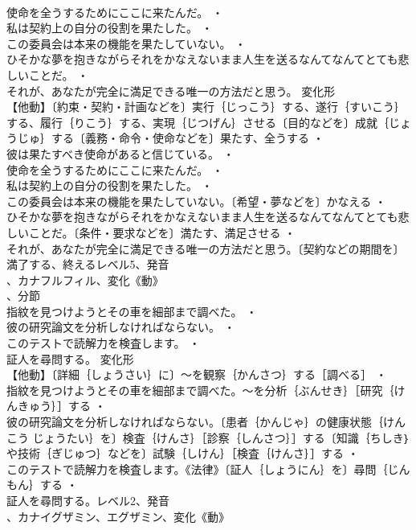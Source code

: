 \documentclass[8pt]{extreport}
\begin{document}
\begin{CJK}{UTF8}{min}
\\	使命を全うするためにここに来たんだ。 ・
\\	私は契約上の自分の役割を果たした。 ・
\\	この委員会は本来の機能を果たしていない。 ・
\\	ひそかな夢を抱きながらそれをかなえないまま人生を送るなんてなんてとても悲しいことだ。 ・
\\	それが、あなたが完全に満足できる唯一の方法だと思う。	変化形 
\\	【他動】〔約束・契約・計画などを〕実行｛じっこう｝する、遂行｛すいこう｝する、履行｛りこう｝する、実現｛じつげん｝させる〔目的などを〕成就｛じょうじゅ｝する〔義務・命令・使命などを〕果たす、全うする ・
\\	彼は果たすべき使命があると信じている。 ・
\\	使命を全うするためにここに来たんだ。 ・
\\	私は契約上の自分の役割を果たした。 ・
\\	この委員会は本来の機能を果たしていない。〔希望・夢などを〕かなえる ・
\\	ひそかな夢を抱きながらそれをかなえないまま人生を送るなんてなんてとても悲しいことだ。〔条件・要求などを〕満たす、満足させる ・
\\	それが、あなたが完全に満足できる唯一の方法だと思う。〔契約などの期間を〕満了する、終えるレベル5、発音
\\	、カナフルフィル、変化《動》
\\	、分節
\\	指紋を見つけようとその車を細部まで調べた。 ・
\\	彼の研究論文を分析しなければならない。 ・
\\	このテストで読解力を検査します。 ・
\\	証人を尋問する。	変化形 
\\	【他動】〔詳細｛しょうさい｝に〕～を観察｛かんさつ｝する［調べる］ ・
\\	指紋を見つけようとその車を細部まで調べた。～を分析｛ぶんせき｝［研究｛けんきゅう｝］する ・
\\	彼の研究論文を分析しなければならない。〔患者｛かんじゃ｝の健康状態｛けんこう じょうたい｝を〕検査｛けんさ｝［診察｛しんさつ｝］する〔知識｛ちしき｝や技術｛ぎじゅつ｝などを〕試験｛しけん｝［検査｛けんさ｝］する ・
\\	このテストで読解力を検査します。《法律》〔証人｛しょうにん｝を〕尋問｛じんもん｝する ・
\\	証人を尋問する。レベル2、発音
\\	、カナイグザミン、エグザミン、変化《動》

\end{CJK}
\end{document}
